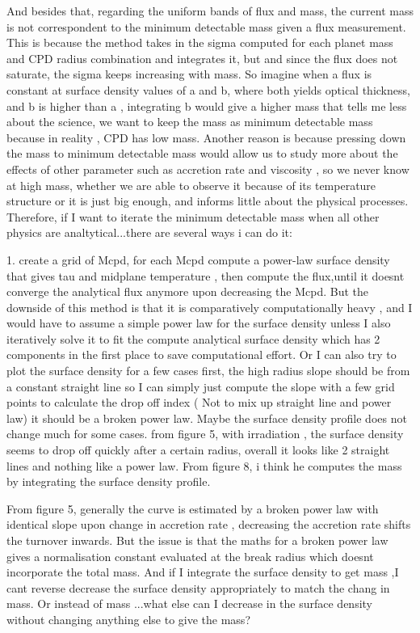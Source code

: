 \documentclass{article}
\begin{document}
And besides that, regarding the uniform bands of flux and mass, the current mass is not correspondent to the minimum detectable mass given a flux measurement. 
This is because the method takes in the sigma computed for each planet mass and CPD radius combination and integrates it, but and since the flux does not saturate, the sigma keeps increasing with mass.
So imagine when a flux is constant at surface density values of a and b, where both yields optical thickness, and b is higher than a , integrating b would give a higher mass that tells me less about the science, we want to keep the mass as minimum detectable mass because in reality , CPD has low mass.
Another reason is because pressing down the mass to minimum detectable mass would allow us to study more about the effects of other parameter such as accretion rate and viscosity , so we never know at high mass, whether we are able to observe it because of its temperature structure or it is just big enough, and informs little about the physical processes.
Therefore, if I want to iterate the minimum detectable mass when all other physics are analtytical...there are several ways i can do it:

1. create a grid of Mcpd, for each Mcpd compute a power-law surface density that gives tau and midplane temperature , then compute the flux,until it doesnt converge the analytical flux anymore upon decreasing the Mcpd. But the downside of this method is that 
it is comparatively computationally heavy ,  and I would have to assume a simple power law for the surface density unless I also iteratively solve it to fit the compute analytical surface density which has 2 components in the first place to save computational effort.
Or I can also try to plot the surface density for a few cases first, the high radius slope should be from a constant straight line so I can simply just compute the slope with a few grid points to calculate the drop off index ( Not to mix up straight line and power law) it should be a broken power law.
Maybe the surface density profile does not change much for some cases. from figure 5, with irradiation , the surface density seems to drop off quickly after a certain radius, overall it looks like 2 straight lines and nothing like a power law.
From  figure 8, i think he computes the mass by integrating the surface density profile.

From figure 5, generally the curve is estimated by a broken power law with identical slope upon change in accretion rate , decreasing the accretion rate shifts the turnover inwards.
But the issue is that the maths for a broken power law gives a normalisation constant evaluated at the break radius which doesnt incorporate the total mass. And if I integrate the surface density to get mass ,I cant reverse decrease the surface density appropriately to match the chang in mass.
Or instead of mass ...what else can I decrease in the surface density without changing anything else to give the mass? 
\end{document}
